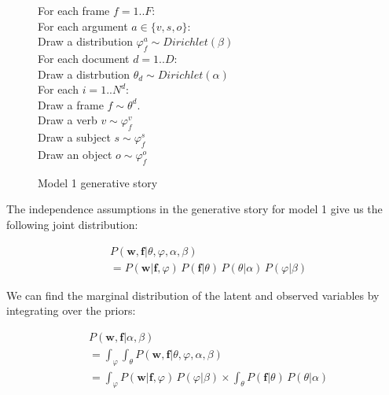 \documentclass[11pt,twocolumn,DIV=11]{scrartcl}
\renewcommand\phi\varphi
\begin{document}
\begin{figure}

    \begin{snugshade}
    \scriptsize
    For each frame $f=1..F$:\\
    \hspace*{15pt} For each argument $a\in\{v,s,o\}$:\\
    \hspace*{30pt} Draw a distribution $\phi_f^a\sim Dirichlet(\beta)$\\
    For each document $d=1..D$:\\
    \hspace*{15pt} Draw a distrbution $\theta_d \sim Dirichlet(\alpha)$\\
    \hspace*{30pt} For each $i = 1..N^d$:\\
    \hspace*{30pt} Draw a frame $f \sim \theta^d$.\\
    \hspace*{30pt} Draw a verb $v \sim \phi_f^v$\\
    \hspace*{30pt} Draw a subject $s \sim \phi_f^s$\\
    \hspace*{30pt} Draw an object $o \sim \phi_f^o$
    \end{snugshade}

    

    \caption{Model 1 generative story}
    \label{gen1}

\end{figure}

The independence assumptions in the generative story for model 1 give us the 
following joint distribution:

\begin{align*}
&P(\mathbf{w},\mathbf{f}|\theta,\phi,\alpha,\beta)\\
&=P(\mathbf{w}|\mathbf{f},\phi)\,P(\mathbf{f}|\theta)\,P(\theta|\alpha)\,P(\phi|\beta)
\end{align*}

We can find the marginal distribution of the latent and observed variables by
integrating over the priors:

\begin{align*}
& P(\mathbf{w},\mathbf{f}|\alpha,\beta)\\
&=\int_\phi\int_\theta P(\mathbf{w},\mathbf{f}|\theta,\phi,\alpha,\beta)\\
&=     \int_\phi P(\mathbf{w}|\mathbf{f},\phi )\,P(\phi|\beta)
\times \int_\theta P(\mathbf{f}|\theta)\,P(\theta|\alpha)
\end{align*}
\end{document}
